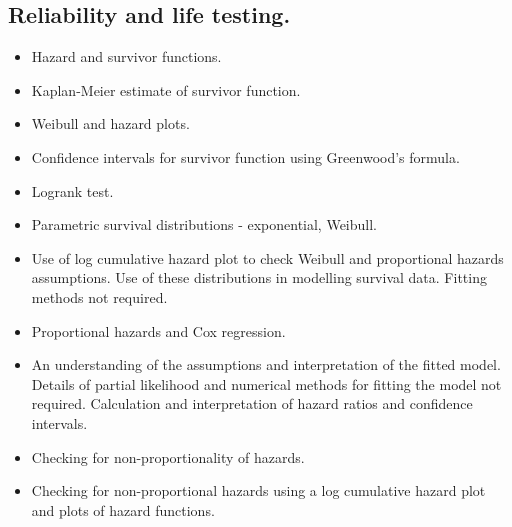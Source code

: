 \subsection*{Reliability and life testing.}

\begin{itemize}
\item	Hazard and survivor functions.
\item	Kaplan-Meier estimate of survivor function.
\item	Weibull and hazard plots.
\item	Confidence intervals for survivor function using Greenwood's formula.
\item	Logrank test.
\item	Parametric survival distributions - exponential, Weibull.
\item	Use of log cumulative hazard plot to check Weibull and proportional hazards assumptions. Use of these distributions in modelling survival data. Fitting methods not required.
\item	Proportional hazards and Cox regression.
\item	An understanding of the assumptions and interpretation of the fitted model. Details of partial likelihood and numerical methods for fitting the model not required. Calculation and interpretation of hazard ratios and confidence intervals.
\item	Checking for non-proportionality of hazards.
\item	Checking for non-proportional hazards using a log cumulative hazard plot and plots of hazard functions.
\end{itemize}

